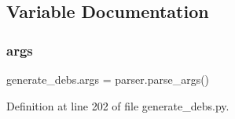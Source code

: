 \subsection{Variable Documentation}
\mbox{\label{namespacegenerate__debs_a75f9143e38df82d83b2e8a6f99cae02c}} 
\subsubsection{\texorpdfstring{args}{args}}
{\footnotesize\ttfamily generate\+\_\+debs.\+args = parser.\+parse\+\_\+args()}



Definition at line 202 of file generate\+\_\+debs.\+py.



